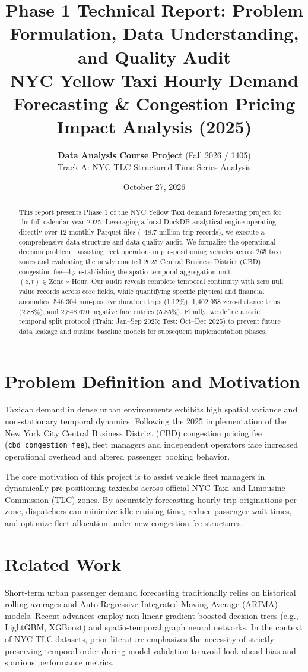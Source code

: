 \documentclass[11pt,a4paper]{article}
\title{\textbf{\Large Phase 1 Technical Report: Problem Formulation, Data Understanding, and Quality Audit}\\
\large NYC Yellow Taxi Hourly Demand Forecasting \& Congestion Pricing Impact Analysis (2025)}
\author{\textbf{Data Analysis Course Project} (Fall 2026 / 1405)\\
Track A: NYC TLC Structured Time-Series Analysis}
\date{October 27, 2026}
\begin{document}
\maketitle

\begin{abstract}
This report presents Phase 1 of the NYC Yellow Taxi demand forecasting project for the full calendar year 2025. Leveraging a local DuckDB analytical engine operating directly over 12 monthly Parquet files (~48.7 million trip records), we execute a comprehensive data structure and data quality audit. We formalize the operational decision problem—assisting fleet operators in pre-positioning vehicles across 265 taxi zones and evaluating the newly enacted 2025 Central Business District (CBD) congestion fee—by establishing the spatio-temporal aggregation unit $(z, t) \in \text{Zone} \times \text{Hour}$. Our audit reveals complete temporal continuity with zero null value records across core fields, while quantifying specific physical and financial anomalies: 546,304 non-positive duration trips (1.12\%), 1,402,958 zero-distance trips (2.88\%), and 2,848,620 negative fare entries (5.85\%). Finally, we define a strict temporal split protocol (Train: Jan--Sep 2025; Test: Oct--Dec 2025) to prevent future data leakage and outline baseline models for subsequent implementation phases.
\end{abstract}

\section{Problem Definition and Motivation}
Taxicab demand in dense urban environments exhibits high spatial variance and non-stationary temporal dynamics. Following the 2025 implementation of the New York City Central Business District (CBD) congestion pricing fee (\texttt{cbd\_congestion\_fee}), fleet managers and independent operators face increased operational overhead and altered passenger booking behavior.

The core motivation of this project is to assist vehicle fleet managers in dynamically pre-positioning taxicabs across official NYC Taxi and Limousine Commission (TLC) zones. By accurately forecasting hourly trip originations per zone, dispatchers can minimize idle cruising time, reduce passenger wait times, and optimize fleet allocation under new congestion fee structures.

\section{Related Work}
Short-term urban passenger demand forecasting traditionally relies on historical rolling averages and Auto-Regressive Integrated Moving Average (ARIMA) models. Recent advances employ non-linear gradient-boosted decision trees (e.g., LightGBM, XGBoost) and spatio-temporal graph neural networks. In the context of NYC TLC datasets, prior literature emphasizes the necessity of strictly preserving temporal order during model validation to avoid look-ahead bias and spurious performance metrics.
\end{document}
